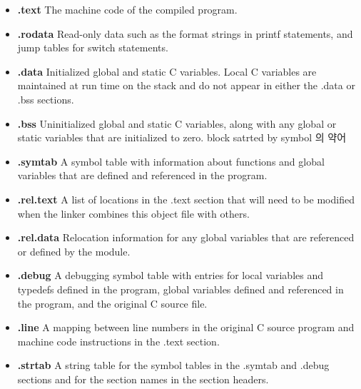 \documentclass[10pt]{beamer}
\begin{document}
\begin{frame}{}
    \begin{itemize}
        \item \textbf{.text} The machine code of the compiled program.
        
        \item \textbf{.rodata} Read-only data such as the format strings in printf statements, and jump tables for switch statements.
        
        \item  \textbf{.data} Initialized global and static C variables. Local C variables are maintained at run time on the stack and do not appear in either the .data or .bss sections.
        
        \item \textbf{.bss} Uninitialized global and static C variables, along with any global or static variables that are initialized to zero. block satrted by symbol 의 약어
        
        \item \textbf{.symtab} A symbol table with information about functions and global variables that are defined and referenced in the program. 
    
        \item \textbf{.rel.text} A list of locations in the .text section that will need to be modified when the linker combines this object file with others. 
        
        \item \textbf{.rel.data} Relocation information for any global variables that are referenced or defined by the module.
        
        \item \textbf{.debug} A debugging symbol table with entries for local variables and typedefs defined in the program, global variables defined and referenced in the program, and the original C source file.
        
        \item \textbf{.line} A mapping between line numbers in the original C source program and machine code instructions in the .text section.
        
        \item \textbf{.strtab} A string table for the symbol tables in the .symtab and .debug sections and for the section names in the section headers.
        
    \end{itemize}
\end{frame}    
\end{document}
